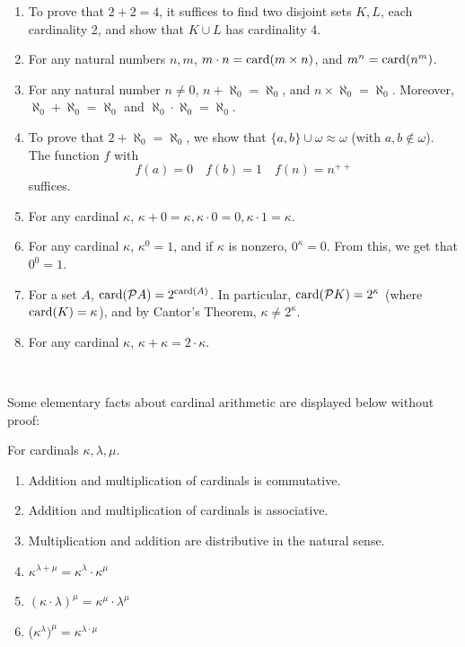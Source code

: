 \begin{example}
    \begin{enumerate}
        \item To prove that $2 + 2 = 4$, it suffices to find two disjoint sets $K,L$, each cardinality 2, and show that $K \cup L$ has cardinality 4. 
        \item For any natural numbers $n,m$, $m \cdot n = \operatorname{card}(m \times n)$, and $m^n = \operatorname{card}(n^m)$. 
        \item For any natural number $n \neq 0$, $n + \aleph_0 = \aleph_0$, and $n \times \aleph_0 = \aleph_0$. Moreover, $\aleph_0 + \aleph_0 = \aleph_0$ and $\aleph_0 \cdot \aleph_0 = \aleph_0$. 
        \item To prove that $2 + \aleph_0 = \aleph_0$, we show that $\{a,b\} \cup \omega \approx \omega$ (with $a,b \notin \omega$). The function $f$ with 
        \[f(a) = 0 \quad f(b) = 1 \quad f(n) = n^{++}\]
        suffices. 
        \item For any cardinal $\kappa$, $\kappa + 0 = \kappa, \kappa \cdot 0 = 0, \kappa \cdot 1 = \kappa$. 
        \item For any cardinal $\kappa$, $\kappa^0 = 1$, and if $\kappa$ is nonzero, $0^\kappa = 0$. From this, we get that $0^0 = 1$.  
        \item For a set $A$, $\operatorname{card}(\mathcal{P}A) = 2^{\operatorname{card}(A)}$. In particular, $\operatorname{card}(\mathcal{P}K) = 2^{\kappa}$ (where $\operatorname{card}(K) = \kappa$), and by Cantor's Theorem, $\kappa \neq 2^{\kappa}$.
        \item For any cardinal $\kappa$, $\kappa + \kappa = 2 \cdot \kappa$. 
    \end{enumerate}
\end{example}\

Some elementary facts about cardinal arithmetic are displayed below without proof:

\begin{theorem}
    For cardinals $\kappa, \lambda, \mu$.
    \begin{enumerate}
        \item Addition and multiplication of cardinals is commutative.
        \item Addition and multiplication of cardinals is associative.
        \item Multiplication and addition are distributive in the natural sense.
        \item $\kappa^{\lambda + \mu} = \kappa^\lambda \cdot \kappa^\mu$
        \item $(\kappa \cdot \lambda)^\mu = \kappa^\mu \cdot \lambda^\mu$
        \item ($\kappa^\lambda)^\mu = \kappa^{\lambda \cdot \mu}$
    \end{enumerate}
\end{theorem}

